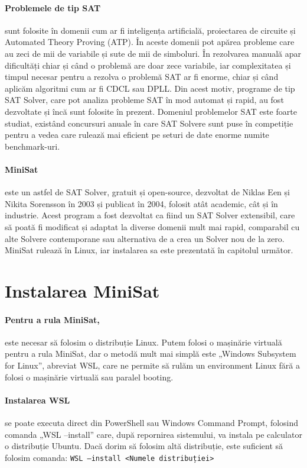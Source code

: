 \documentclass[runningheads]{llncs}
\begin{document}
\paragraph{Problemele de tip SAT} sunt folosite în domenii cum ar fi inteligența artificială, proiectarea de circuite și Automated Theory Proving (ATP). În aceste domenii pot apărea probleme care au zeci de mii de variabile și sute de mii de simboluri. În rezolvarea manuală apar dificultăți chiar și când o problemă are doar zece variabile, iar complexitatea și timpul necesar pentru a rezolva o problemă SAT ar fi enorme, chiar și când aplicăm algoritmi cum ar fi CDCL sau DPLL. Din acest motiv, programe de tip SAT Solver, care pot analiza probleme SAT în mod automat și rapid, au fost dezvoltate și încă sunt folosite în prezent. Domeniul problemelor SAT este foarte studiat, existând concursuri anuale în care SAT Solvere sunt puse în competiție pentru a vedea care rulează mai eficient pe seturi de date enorme numite benchmark-uri.

\paragraph{MiniSat} este un astfel de SAT Solver, gratuit și open-source, dezvoltat de Niklas Een și Nikita Sorensson în 2003 și publicat în 2004, folosit atât academic, cât și în industrie. Acest program a fost dezvoltat ca fiind un SAT Solver extensibil, care să poată fi modificat și adaptat la diverse domenii mult mai rapid, comparabil cu alte Solvere contemporane sau alternativa de a crea un Solver nou de la zero. MiniSat rulează în Linux, iar instalarea sa este prezentată în capitolul următor. \cite{eensorensson2005minisat} \cite{eensorensson2003extensible}

\section{Instalarea MiniSat}

\paragraph{Pentru a rula MiniSat,} este necesar să folosim o distribuție Linux. Putem folosi o mașinărie virtuală pentru a rula MiniSat, dar o metodă mult mai simplă este „Windows Subsystem for Linux”, abreviat WSL, care ne permite să rulăm un environment Linux fără a folosi o mașinărie virtuală sau paralel booting. \cite{minisatmanual}

\paragraph{Instalarea WSL} se poate executa direct din PowerShell sau Windows Command Prompt, folosind comanda „WSL --install” care, după repornirea sistemului, va instala pe calculator o distribuție Ubuntu. Dacă dorim să folosim altă distribuție, este suficient să folosim comanda: \texttt{WSL --install <Numele distribuției>}
\end{document}
